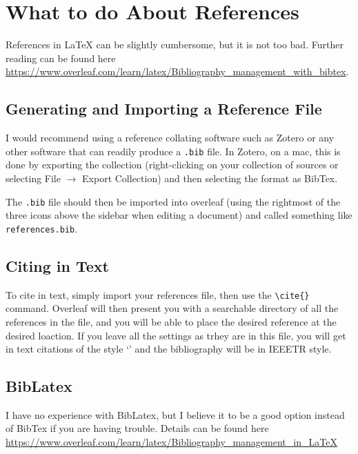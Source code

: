 \chapter{What to do About References}

References in \LaTeX{} can be slightly cumbersome, but it is not too bad. Further reading can be found here \url{https://www.overleaf.com/learn/latex/Bibliography_management_with_bibtex}.

\section{Generating and Importing a Reference File}
I would recommend using a reference collating software such as Zotero or any other software that can readily produce a \verb+.bib+ file. In Zotero, on a mac, this is done by exporting the collection (right-clicking on your collection of sources or selecting File $\rightarrow$ Export Collection) and then selecting the format as BibTex.

The \verb+.bib+ file should then be imported into overleaf (using the rightmost of the three icons above the sidebar when editing a document) and called something like \verb+references.bib+.

\section{Citing in Text}

To cite in text, simply import your references file, then use the \verb+\cite{}+ command. Overleaf will then present you with a searchable directory of all the references in the file, and you will be able to place the desired reference at the desired loaction. If you leave all the settings as trhey are in this file, you will get in text citations of the style `\cite{winter_designing_2018}' and the bibliography will be in IEEETR style. 

\section{BibLatex}

I have no experience with BibLatex, but I believe it to be a good option instead of BibTex if you are having trouble. Details can be found here \url{https://www.overleaf.com/learn/latex/Bibliography_management_in_LaTeX}